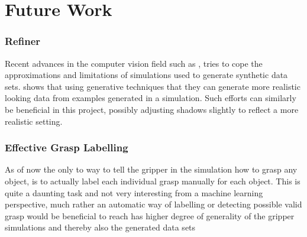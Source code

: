 \section{Future Work}

\subsubsection{Refiner}
Recent advances in the computer vision field such as \cite{applerefiner}, tries to cope the approximations and limitations of simulations used to generate synthetic data sets. \cite{applerefiner} shows that using generative techniques that they can generate more realistic looking data from examples generated in a simulation. Such efforts can similarly be beneficial in this project, possibly adjusting shadows slightly to reflect a more realistic setting. 

\subsubsection{Effective Grasp Labelling}
As of now the only to way to tell the gripper in the simulation how to grasp any object, is to actually label each individual grasp manually for each object. This is quite a daunting task and not very interesting from a machine learning perspective, much rather an automatic way of labelling or detecting possible valid grasp would be beneficial to reach has higher degree of generality of the gripper simulations and thereby also the generated data sets